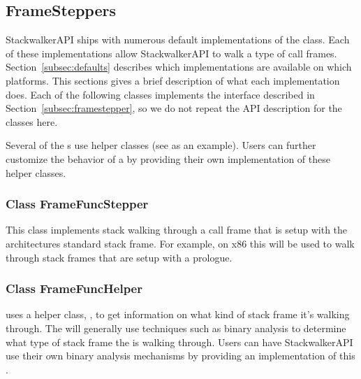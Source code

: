 \subsection{FrameSteppers}
\label{sec:framesteppers}

StackwalkerAPI ships with numerous default implementations of the
class. Each of these  implementations allow StackwalkerAPI to walk a
type of call frames. Section~\ref{subsec:defaults} describes which
 implementations
are available on which platforms. This sections gives a brief description of
what each  implementation does. Each of the following classes
implements the  interface described in
Section~\ref{subsec:framestepper}, so we do not
repeat the API description for the classes here.

Several of the s use helper classes (see
 as an
example). Users can further customize the behavior of a  by
providing their own implementation of these helper classes.

\subsubsection{Class FrameFuncStepper}


This class implements stack walking through a call frame that is setup with the
architectures standard stack frame. For example, on x86 this  will
be used to walk through stack frames that are setup with a  prologue.

\subsubsection{Class FrameFuncHelper}


 uses a helper class, , to get information on
what kind of stack frame it's walking through. The  will
generally use techniques such as binary analysis to determine what type of stack
frame the  is walking through. Users can have StackwalkerAPI use
their own binary analysis mechanisms by providing an implementation of this
.

